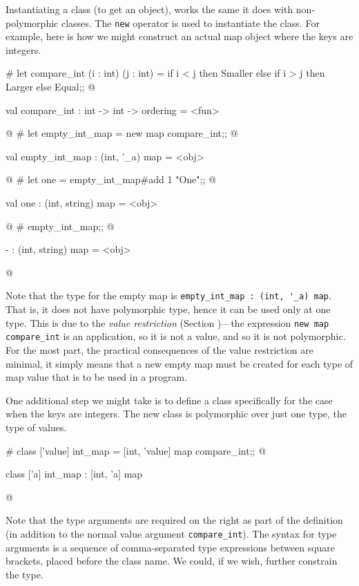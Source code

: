 
Instantiating a class (to get an object), works the same it does with
non-polymorphic classes.  The \hbox{\lstinline$new$} operator is used to
instantiate the class.  For example, here is how we might construct an
actual map object where the keys are integers.

\begin{ocaml}
# let compare_int (i : int) (j : int) =
     if i < j then Smaller
     else if i > j then Larger
     else Equal;;
@
\begin{topoutput}
val compare_int : int -> int -> ordering = <fun>
\end{topoutput}
@
# let empty_int_map = new map compare_int;;
@
\begin{topoutput}
val empty_int_map : (int, '_a) map = <obj>
\end{topoutput}
@
# let one = empty_int_map#add 1 "One";;
@
\begin{topoutput}
val one : (int, string) map = <obj>
\end{topoutput}
@
# empty_int_map;;
@
\begin{topoutput}
- : (int, string) map = <obj>
\end{topoutput}
@
\end{ocaml}
%
Note that the type for the empty map is
\hbox{\lstinline$empty_int_map : (int, '_a) map$}.
That is, it does not have polymorphic type, hence it can be used only
at one type.  This is due to the \emph{value
restriction} (Section )---the
expression \hbox{\lstinline$new map compare_int$} is an application, so it
is not a value, and so it is not polymorphic.
For the most part, the practical consequences of the value restriction
are minimal, it simply means that a new empty map must be created for
each type of map value that is to be used in a program.

One additional step we might take is to define a class specifically for
the case when the keys are integers.  The new class is polymorphic
over just one type, the type of values.

\begin{ocaml}
# class ['value] int_map = [int, 'value] map compare_int;;
@
\begin{topoutput}
class ['a] int_map : [int, 'a] map
\end{topoutput}
@
\end{ocaml}
%
Note that the type arguments are required on the right as part of the
definition (in addition to the normal value
argument \hbox{\lstinline$compare_int$}).  The syntax for type arguments is a
sequence of comma-separated type expressions between square brackets,
placed before the class name.  We could, if we wish, further constrain
the type.

